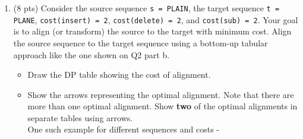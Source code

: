 \documentclass[12pt]{article}
\theoremstyle{remark}
\newtheorem*{solution}{Solution}
\begin{document}
\begin{enumerate}
\begin{enumerate}
    \textbf{Also, draw the alignment corresponding to the arrows} for the given sequences \texttt{s = BEAR} and \texttt{t = BARE} and \textbf{give the set of optimal operations} on the \texttt{s = BEAR} which will transform it to \texttt{t = BARE} (using the cost table with relevant arrows you drew earlier). \\
    An example drawn alignment and set of operations for \texttt{s = STEP} and \texttt{t = APE} look like following. (Show the 'no-op' using a colon (:) to differentiate with a regular sub.)\\\\
    \textbf{Drawn alignment =} $\quad\quad$      \textbf{Ops = }\texttt{['sub', 'sub', 'no-op', 'delete']}
    
    S  T  E  P\\
    $\vert\enspace\enspace\vert\enspace:\thinspace\vert$  \\
    A  P  E  \_\\
    
    \begin{solution}
    
    
    \pagebreak
    \end{solution}
    
    \pagebreak
    \item (8 pts) Consider the source sequence \texttt{s = PLAIN}, the target sequence \texttt{t = PLANE}, \texttt{cost(insert) = 2}, \texttt{cost(delete) = 2}, and \texttt{cost(sub) = 2}. Your goal is to align (or transform) the source to the target with minimum cost. Align the source sequence to the target sequence using a bottom-up tabular approach like the one shown on Q2 part b.
    \begin{itemize}
        \item Draw the DP table showing the cost of alignment.
        \item Show the arrows representing the optimal alignment. Note that there are more than one optimal alignment. Show \textbf{two} of the optimal alignments in separate tables using arrows. 
        \\One such example for different sequences and costs - 
        

\end{itemize}
\end{enumerate}
\end{enumerate}
\end{document}
